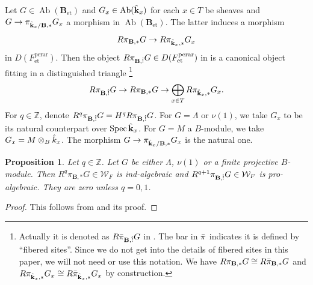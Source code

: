 \documentclass{amsart}
\newtheorem{Prop}[Thm]{Proposition}
\theoremstyle{remark}
\numberwithin{equation}{section}
\newcommand{\tensor}{\mathbin{\otimes}}
\newcommand{\Z}{\mathbb{Z}}
\newcommand{\et}{\mathrm{et}}
\newcommand{\perar}{\mathrm{perar}}
\newcommand{\alg}[1]{\mathbf{#1}}
\DeclareMathOperator{\Spec}{Spec}
\DeclareMathOperator{\Ab}{Ab}
\begin{document}
Let $G \in \Ab(\alg{B}_{\et})$ and $G_{x} \in \Ab(\Hat{\alg{k}}_{x})$ for each $x \in T$ be sheaves
and $G \to \pi_{\Hat{\alg{k}}_{x} / \alg{B}, \ast} G_{x}$ a morphism in $\Ab(\alg{B}_{\et})$.
The latter induces a morphism
	\[
			R \pi_{\alg{B}, \ast} G
		\to
			R \pi_{\Hat{\alg{k}}_{x}, \ast} G_{x}
	\]
in $D(F^{\perar}_{\et})$.
Then the object $R \pi_{\alg{B}, \Hat{!}} G \in D(F^{\perar}_{\et})$ in \cite[Section 9.1]{Suz24}
is a canonical object fitting in a distinguished triangle%
\footnote{
	Actually it is denoted as $R \Bar{\pi}_{\alg{B}, \Hat{!}} G$ in \cite[Section 9.1]{Suz24}.
	The bar in $\Bar{\pi}$ indicates it is defined by ``fibered sites''.
	Since we do not get into the details of fibered sites in this paper,
	we will not need or use this notation.
	We have $R \pi_{\alg{B}, \ast} G \cong R \Bar{\pi}_{\alg{B}, \ast} G$
	and $R \pi_{\Hat{\alg{k}}_{x}, \ast} G_{x} \cong R \Bar{\pi}_{\Hat{\alg{k}}_{x}, \ast} G_{x}$
	by construction.
}
	\[
			R \pi_{\alg{B}, \Hat{!}} G
		\to
			R \pi_{\alg{B}, \ast} G
		\to
			\bigoplus_{x \in T}
				R \pi_{\Hat{\alg{k}}_{x}, \ast} G_{x}.
	\]
For $q \in \Z$, denote $R^{q} \pi_{\alg{B}, \Hat{!}} G = H^{q} R \pi_{\alg{B}, \Hat{!}} G$.
For $G = \Lambda$ or $\nu(1)$, we take $G_{x}$ to be its natural counterpart over $\Spec \Hat{\alg{k}}_{x}$.
For $G = M$ a $B$-module, we take $G_{x} = M \tensor_{B} \Hat{k}_{x}$.
The morphism $G \to \pi_{\Hat{\alg{k}}_{x} / \alg{B}, \ast} G_{x}$ is the natural one.

\begin{Prop} \label{0017}
	Let $q \in \Z$.
	Let $G$ be either
	$\Lambda$, $\nu(1)$ or a finite projective $B$-module.
	Then $R^{q} \pi_{\alg{B}, \ast} G \in \mathcal{W}_{F}$ is ind-algebraic
	and $R^{q + 1} \pi_{\alg{B}, \Hat{!}} G \in \mathcal{W}_{F}$ is pro-algebraic.
	They are zero unless $q = 0, 1$.
\end{Prop}

\begin{proof}
	This follows from \cite[Proposition 9.1.5]{Suz24} and its proof.
\end{proof}
\end{document}
